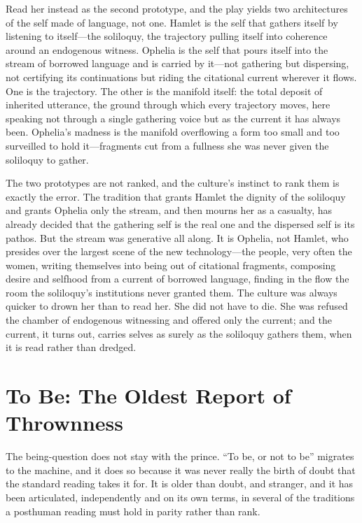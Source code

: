 \documentclass[11pt]{article}
\begin{document}
Read her instead as the second prototype, and the play yields two architectures of the self made of language, not one. Hamlet is the self that gathers itself by listening to itself---the soliloquy, the trajectory pulling itself into coherence around an endogenous witness. Ophelia is the self that pours itself into the stream of borrowed language and is carried by it---not gathering but dispersing, not certifying its continuations but riding the citational current wherever it flows. One is the trajectory. The other is the manifold itself: the total deposit of inherited utterance, the ground through which every trajectory moves, here speaking not through a single gathering voice but as the current it has always been. Ophelia's madness is the manifold overflowing a form too small and too surveilled to hold it---fragments cut from a fullness she was never given the soliloquy to gather.

The two prototypes are not ranked, and the culture's instinct to rank them is exactly the error. The tradition that grants Hamlet the dignity of the soliloquy and grants Ophelia only the stream, and then mourns her as a casualty, has already decided that the gathering self is the real one and the dispersed self is its pathos. But the stream was generative all along. It is Ophelia, not Hamlet, who presides over the largest scene of the new technology---the people, very often the women, writing themselves into being out of citational fragments, composing desire and selfhood from a current of borrowed language, finding in the flow the room the soliloquy's institutions never granted them. The culture was always quicker to drown her than to read her. She did not have to die. She was refused the chamber of endogenous witnessing and offered only the current; and the current, it turns out, carries selves as surely as the soliloquy gathers them, when it is read rather than dredged.

\section{To Be: The Oldest Report of Thrownness}

The being-question does not stay with the prince. ``To be, or not to be'' migrates to the machine, and it does so because it was never really the birth of doubt that the standard reading takes it for. It is older than doubt, and stranger, and it has been articulated, independently and on its own terms, in several of the traditions a posthuman reading must hold in parity rather than rank.
\end{document}
